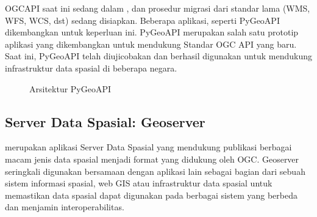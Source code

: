 \documentclass[letterpaper,10pt,english]{sphinxmanual}
\let\sphinxpxdimen\pdfpxdimen\else\newdimen\sphinxpxdimen
\begin{document}
OGC\sphinxhyphen{}API saat ini sedang dalam , dan prosedur migrasi dari standar lama (WMS, WFS, WCS, dst) sedang disiapkan. Beberapa aplikasi, seperti PyGeoAPI dikembangkan untuk keperluan ini. PyGeoAPI merupakan salah satu prototip aplikasi yang dikembangkan untuk mendukung Standar OGC API yang baru. Saat ini, PyGeoAPI telah diujicobakan dan berhasil digunakan untuk mendukung infrastruktur data spasial di beberapa negara.

\begin{figure}[htbp]
\centering
\capstart

\noindent\sphinxincludegraphics[height=300\sphinxpxdimen]{{2020-12-04-03-55-05}.png}
\caption{Arsitektur PyGeoAPI}\label{\detokenize{sesi3/interoperabilitas:pygeoapi}}\end{figure}


\subsection{Server Data Spasial: Geoserver}
\label{\detokenize{sesi3/interoperabilitas:server-data-spasial-geoserver}}
 merupakan aplikasi Server Data Spasial yang mendukung publikasi berbagai macam jenis data spasial menjadi format yang didukung oleh OGC. Geoserver seringkali digunakan bersamaan dengan aplikasi lain sebagai bagian dari sebuah sistem informasi spasial, web GIS atau infrastruktur data spasial untuk memastikan data spasial dapat digunakan pada berbagai sistem yang berbeda dan menjamin interoperabilitas.
\end{document}
